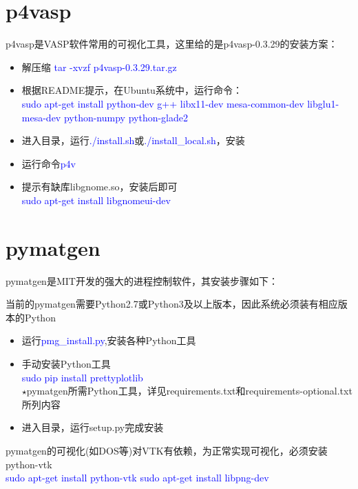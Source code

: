 \documentclass{article}      %
\begin{document}
\section{p4vasp}
\textrm{p4vasp}是\textrm{VASP}软件常用的可视化工具，这里给的是\textrm{p4vasp-0.3.29}的安装方案：
\begin{itemize}
	\item 解压缩 \textcolor{blue}{tar\; -xvzf\; p4vasp-0.3.29.tar.gz}
	\item 根据\textrm{README}提示，在\textrm{Ubuntu}系统中，运行命令：\\
		\textcolor{blue}{sudo\; apt-get\; install\; python-dev\; g++\; libx11-dev\; mesa-common-dev\; libglu1-mesa-dev\; python-numpy\; python-glade2}
	\item 进入目录，运行\textcolor{blue}{./install.sh}或\textcolor{blue}{./install\_local.sh}，安装
	\item 运行命令\textcolor{blue}{p4v}
	\item 提示有缺库\textrm{libgnome.so}，安装后即可\\
\textcolor{blue}{sudo\; apt-get\; install\; libgnomeui-dev}
\end{itemize}

\section{pymatgen}
\textrm{pymatgen}是\textrm{MIT}开发的强大的进程控制软件，其安装步骤如下：

当前的\textrm{pymatgen}需要\textrm{Python2.7}或\textrm{Python3}及以上版本，因此系统必须装有相应版本的\textrm{Python}

\begin{itemize}
	\item 运行\textcolor{blue}{pmg\_install.py},安装各种\textrm{Python}工具
	\item 手动安装\textrm{Python}工具\\
		\textcolor{blue}{sudo pip install prettyplotlib}\\
		$\star$\textrm{pymatgen}所需\textrm{Python}工具，详见\textrm{requirements.txt}和\textrm{requirements-optional.txt}所列内容
	\item 进入目录，运行\textrm{setup.py}完成安装
\end{itemize}
\textrm{pymatgen}的可视化(如\textrm{DOS}等)对\textrm{VTK}有依赖，为正常实现可视化，必须安装\textrm{python-vtk}\\
\textcolor{blue}{sudo\; apt-get\; install\; python-vtk}
\textcolor{blue}{sudo\; apt-get\; install\; libpng-dev}
\end{document}
